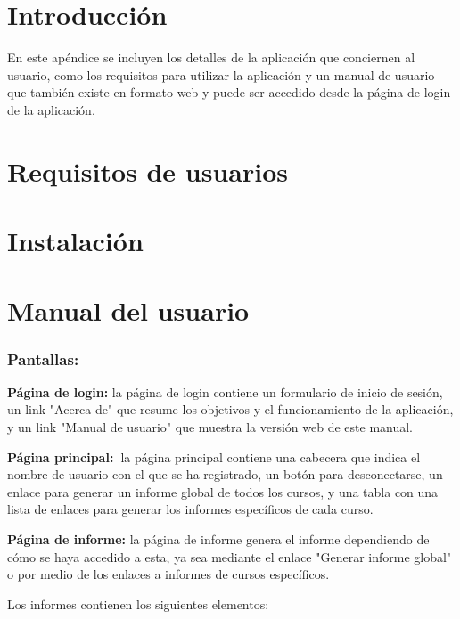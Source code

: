
\section{Introducción}
En este apéndice se incluyen los detalles de la aplicación que conciernen al usuario, como los requisitos para utilizar la aplicación y un manual de usuario que también existe en formato web y puede ser accedido desde la página de login de la aplicación.
\section{Requisitos de usuarios}

\section{Instalación}

\section{Manual del usuario}

\subsubsection{Pantallas:}

\textbf{Página de login:} la página de login contiene un formulario de
inicio de sesión, un link "Acerca de" que resume los objetivos y el
funcionamiento de la aplicación, y un link "Manual de usuario" que
muestra la versión web de este manual.

\textbf{Página principal:~}la página principal contiene una cabecera que
indica el nombre de usuario con el que se ha registrado, un botón para
desconectarse, un enlace para generar un informe global de todos los
cursos, y una tabla con una lista de enlaces para generar los informes
específicos de cada curso.

\textbf{Página de informe:} la página de informe genera el informe
dependiendo de cómo se haya accedido a esta, ya sea mediante el enlace
"Generar informe global" o por medio de los enlaces a informes de cursos
específicos.~

Los informes contienen los siguientes elementos:

